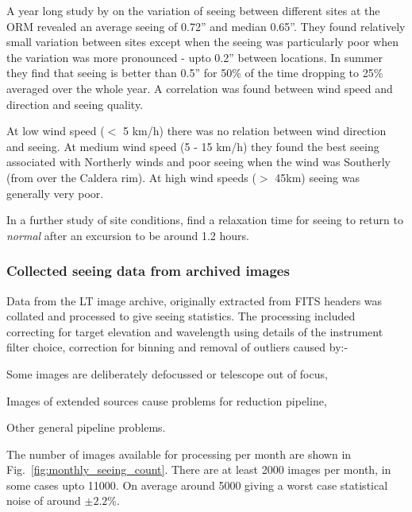 {{A year long study by \citet{munoz98homogeneity} on the variation of seeing between different sites at the ORM revealed an average seeing of 0.72'' and median 0.65''. They found relatively small variation between sites except when the seeing was particularly poor when the variation was more pronounced - upto 0.2'' between locations. In summer they find that seeing is better than 0.5'' for 50\% of the time dropping to 25\% averaged over the whole year. A correlation was found between wind speed and direction and seeing quality. 

At low wind speed ($<$ 5 km/h) there was no relation between wind direction and seeing. At medium wind speed (5 - 15 km/h) they found the best seeing associated with Northerly winds and poor seeing when the wind was Southerly (from over the Caldera rim). At high wind speeds ($>$ 45km) seeing was generally very poor. 

In a further study of site conditions, \citet{vernin98temporal} find a relaxation time for seeing to return to \emph{normal} after an excursion to be around 1.2 hours.


\subsubsection{Collected seeing data from archived images}
\label{sect:collseedata}

Data from the LT image archive, originally extracted from FITS headers was collated and processed to give seeing statistics. The processing included correcting for target elevation and wavelength using details of the instrument filter choice, correction for binning and removal of outliers caused by:- \begin{inparaenum}
\item Some images are deliberately defocussed or telescope out of focus,
\item Images of extended sources cause problems for reduction pipeline,
\item Other general pipeline problems.
\end{inparaenum}

The number of images available for processing per month are shown in Fig.~\ref{fig:monthly_seeing_count}. There are at least 2000 images per month, in some cases upto 11000. On average around 5000 giving a worst case statistical noise of around $\pm 2.2$\%. 

}}
